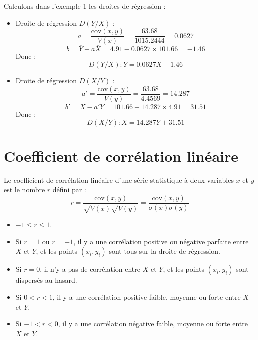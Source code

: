 \documentclass[11pt]{article}
\begin{document}
\begin{exemple}
Calculons dans l'exemple 1 les droites de régression :
\begin{itemize}
    \item Droite de régression \( D(Y/X) \) :
    \[
    a = \frac{\text{cov}(x, y)}{V(x)} = \frac{63.68}{1015.2444} = 0.0627
    \]
    \[
    b = \overline{Y} - a\overline{X} = 4.91 - 0.0627 \times 101.66 = -1.46
    \]
    Donc :
    \[
    D(Y/X) : Y = 0.0627X - 1.46
    \]

    \item Droite de régression \( D(X/Y) \) :
    \[
    a' = \frac{\text{cov}(x, y)}{V(y)} = \frac{63.68}{4.4569} = 14.287
    \]
    \[
    b' = \overline{X} - a'\overline{Y} = 101.66 - 14.287 \times 4.91 = 31.51
    \]
    Donc :
    \[
    D(X/Y) : X = 14.287Y + 31.51
    \]
\end{itemize}
\end{exemple}

\section{Coefficient de corrélation linéaire}

\begin{definition}
Le coefficient de corrélation linéaire d’une série statistique à deux variables \( x \) et \( y \) est le nombre \( r \) défini par :
\[
r = \frac{\text{cov}(x, y)}{\sqrt{V(x)} \sqrt{V(y)}} = \frac{\text{cov}(x, y)}{\sigma(x) \sigma(y)}
\]
\end{definition}

\begin{remarque}
\begin{itemize}
    \item \(-1 \leq r \leq 1\).
    \item Si \( r = 1 \) ou \( r = -1 \), il y a une corrélation positive ou négative parfaite entre \( X \) et \( Y \), et les points \( (x_i, y_i) \) sont tous sur la droite de régression.
    \item Si \( r = 0 \), il n’y a pas de corrélation entre \( X \) et \( Y \), et les points \( (x_i, y_i) \) sont dispersés au hasard.
    \item Si \( 0 < r < 1 \), il y a une corrélation positive faible, moyenne ou forte entre \( X \) et \( Y \).
    \item Si \( -1 < r < 0 \), il y a une corrélation négative faible, moyenne ou forte entre \( X \) et \( Y \).
\end{itemize}
\end{remarque}
\end{document}
